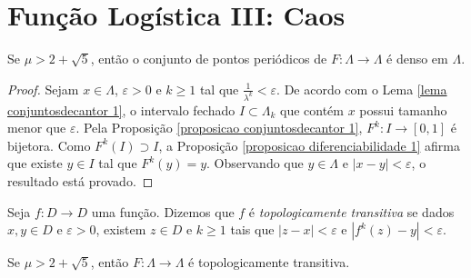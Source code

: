 \section{Função Logística III: Caos}


\begin{proposition}
\label{proposicao caos 1}
Se $\mu > 2 + \sqrt{5}$, então o conjunto de pontos periódicos de $F: \Lambda \to \Lambda$ é denso em $\Lambda$.
\end{proposition}

\begin{proof}
Sejam $x \in \Lambda$, $\varepsilon > 0$ e $k \geq 1$ tal que $\frac{1}{\lambda^k} < \varepsilon$. De acordo com o Lema \ref{lema conjuntosdecantor 1}, o intervalo fechado $I \subset \Lambda_k$ que contém $x$ possui tamanho menor que $\varepsilon$. Pela Proposição \ref{proposicao conjuntosdecantor 1}, $F^k: I \to [0, 1]$ é bijetora. Como $F^k(I) \supset I$, a Proposição \ref{proposicao diferenciabilidade 1} afirma que existe $y \in I$ tal que $F^k(y) = y$. Observando que $y \in \Lambda$ e $|x - y| < \varepsilon$, o resultado está provado.
\end{proof}


\begin{definition}
Seja $f: D \to D$ uma função. Dizemos que $f$ é \textit{topologicamente transitiva} se dados $x, y \in D$ e $\varepsilon > 0$,  existem $z \in D$ e $k \geq 1$ tais que $|z - x| < \varepsilon$ e $|f^k(z) - y| < \varepsilon$.
\end{definition} 


\begin{proposition}
\label{proposicao caos 2}
Se $\mu > 2 + \sqrt{5}$, então $F: \Lambda \to \Lambda$ é topologicamente transitiva.
\end{proposition}

